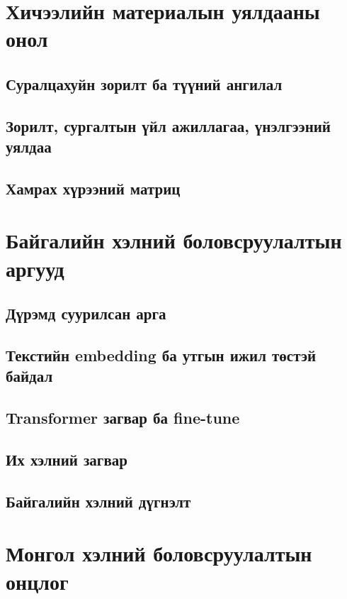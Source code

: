 \section{Хичээлийн материалын уялдааны онол} %
\subsection{Суралцахуйн зорилт ба түүний ангилал}
\ph
\subsection{Зорилт, сургалтын үйл ажиллагаа, үнэлгээний уялдаа}
\ph
\subsection{Хамрах хүрээний матриц}
\ph

\section{Байгалийн хэлний боловсруулалтын аргууд} %
\subsection{Дүрэмд суурилсан арга}
\ph
\subsection{Текстийн embedding ба утгын ижил төстэй байдал}
\ph
\subsection{Transformer загвар ба fine-tune}
\ph
\subsection{Их хэлний загвар}
\ph
\subsection{Байгалийн хэлний дүгнэлт}
\ph

\section{Монгол хэлний боловсруулалтын онцлог} %
